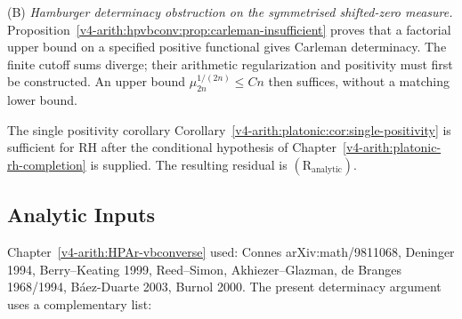 (B) \emph{Hamburger determinacy obstruction on the symmetrised shifted-zero
measure.}
Proposition~\ref{v4-arith:hpvbconv:prop:carleman-insufficient} proves
that a factorial upper bound on a specified positive functional gives
Carleman determinacy. The finite cutoff sums diverge; their arithmetic
regularization and positivity must first be constructed. An upper
bound \(\mu_{2n}^{1/(2n)}\leq Cn\) then suffices, without a matching
lower bound.

The single positivity corollary
Corollary~\ref{v4-arith:platonic:cor:single-positivity} is sufficient for RH
after the conditional hypothesis of
Chapter~\ref{v4-arith:platonic-rh-completion} is supplied. The resulting
residual is \((\mathrm{R}_{\mathrm{analytic}})\).

\subsection{Analytic Inputs}
\label{v4-arith:hpar-det:sources}

Chapter~\ref{v4-arith:HPAr-vbconverse} used: Connes arXiv:math/9811068, Deninger 1994, Berry--Keating
1999, Reed--Simon, Akhiezer--Glazman, de Branges 1968/1994,
B\'aez-Duarte 2003, Burnol 2000. The present determinacy argument uses
a complementary list:

